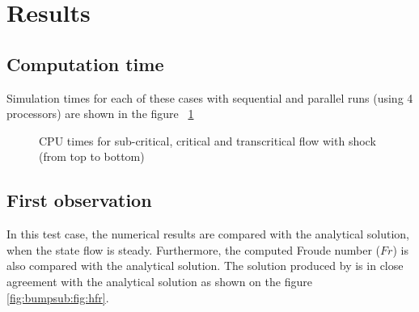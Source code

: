 \section{Results}

\subsection{Computation time}

Simulation times for each of these cases with sequential and parallel runs (using 4 processors) are shown in the figure ~\ref{fig:bump:cputime}

\begin{figure}[H]
  \centering
  \caption{CPU times for sub-critical, critical and transcritical flow with shock (from top to bottom)}\label{fig:bump:cputime}
\end{figure}


\subsection{First observation}

In this test case, the numerical results are compared with the
analytical solution, when the state flow is steady. Furthermore, the computed
Froude number ($Fr$) is also
compared with the analytical solution.
The solution produced by  is in close agreement with
the analytical solution as shown on the
figure \ref{fig:bumpsub:fig:hfr}.


